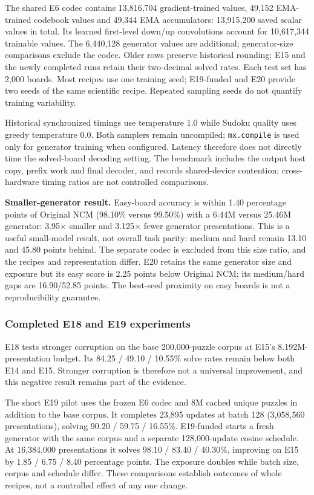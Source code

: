 \documentclass[
  british,
]{article}
\begin{document}
The shared E6 codec contains 13,816,704 gradient-trained values, 49,152
EMA-trained codebook values and 49,344 EMA accumulators: 13,915,200
saved scalar values in total. Its learned first-level down/up
convolutions account for 10,617,344 trainable values. The 6,440,128
generator values are additional; generator-size comparisons exclude the
codec. Older rows preserve historical rounding; E15 and the newly
completed runs retain their two-decimal solved rates. Each test set has
2,000 boards. Most recipes use one training seed; E19-funded and E20
provide two seeds of the same scientific recipe. Repeated sampling seeds
do not quantify training variability.

Historical synchronized timings use temperature 1.0 while Sudoku quality
uses greedy temperature 0.0. Both samplers remain uncompiled;
\texttt{mx.compile} is used only for generator training when configured.
Latency therefore does not directly time the solved-board decoding
setting. The benchmark includes the output host copy, prefix work and
final decoder, and records shared-device contention; cross-hardware
timing ratios are not controlled comparisons.

\textbf{Smaller-generator result.} Easy-board accuracy is within 1.40
percentage points of Original NCM (98.10\% versus 99.50\%) with a 6.44M
versus 25.46M generator: 3.95× smaller and 3.125× fewer generator
presentations. This is a useful small-model result, not overall task
parity: medium and hard remain 13.10 and 45.80 points behind. The
separate codec is excluded from this size ratio, and the recipes and
representation differ. E20 retains the same generator size and exposure
but its easy score is 2.25 points below Original NCM; its medium/hard
gaps are 16.90/52.85 points. The best-seed proximity on easy boards is
not a reproducibility guarantee.

\subsubsection{Completed E18 and E19
experiments}\label{completed-e18-and-e19-experiments}

E18 tests stronger corruption on the base 200,000-puzzle corpus at E15's
8.192M-presentation budget. Its 84.25 / 49.10 / 10.55\% solve rates
remain below both E14 and E15. Stronger corruption is therefore not a
universal improvement, and this negative result remains part of the
evidence.

The short E19 pilot uses the frozen E6 codec and 8M cached unique
puzzles in addition to the base corpus. It completes 23,895 updates at
batch 128 (3,058,560 presentations), solving 90.20 / 59.75 / 16.55\%.
E19-funded starts a fresh generator with the same corpus and a separate
128,000-update cosine schedule. At 16,384,000 presentations it solves
98.10 / 83.40 / 40.30\%, improving on E15 by 1.85 / 6.75 / 8.40
percentage points. The exposure doubles while batch size, corpus and
schedule differ. These comparisons establish outcomes of whole recipes,
not a controlled effect of any one change.
\end{document}
